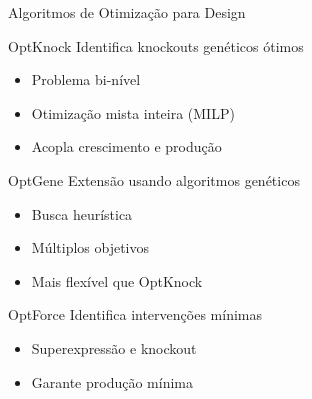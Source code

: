 \begin{frame}{Algoritmos de Otimização para Design}
\begin{block}{OptKnock}
Identifica knockouts genéticos ótimos
\begin{itemize}
    \item Problema bi-nível
    \item Otimização mista inteira (MILP)
    \item Acopla crescimento e produção
\end{itemize}
\end{block}

\begin{block}{OptGene}
Extensão usando algoritmos genéticos
\begin{itemize}
    \item Busca heurística
    \item Múltiplos objetivos
    \item Mais flexível que OptKnock
\end{itemize}
\end{block}

\begin{block}{OptForce}
Identifica intervenções mínimas
\begin{itemize}
    \item Superexpressão e knockout
    \item Garante produção mínima
\end{itemize}
\end{block}
\end{frame}

